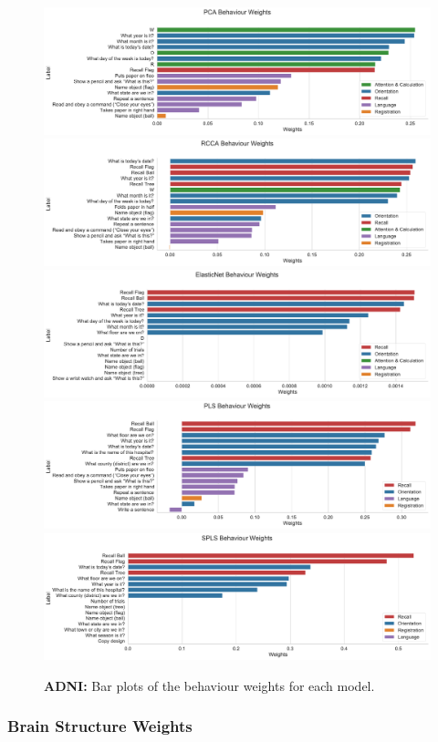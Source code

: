 \begin{figure}
    \centering
    \includegraphics[width=0.8\linewidth]{figures/adni/PCA behaviour weights}
    \includegraphics[width=0.8\linewidth]{figures/adni/RCCA behaviour weights}
    \includegraphics[width=0.8\linewidth]{figures/adni/ElasticNet behaviour weights}
    \includegraphics[width=0.8\linewidth]{figures/adni/PLS behaviour weights}
    \includegraphics[width=0.8\linewidth]{figures/adni/SPLS behaviour weights}
    \caption{\textbf{ADNI:} Bar plots of the behaviour \gls{weights} for each model.}\label{fig:adni-beh}
\end{figure}

\subsubsection{Brain Structure Weights}

